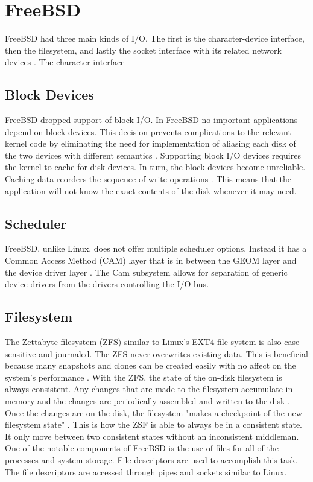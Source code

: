 \section{FreeBSD}
FreeBSD had three main kinds of I/O. The first is the character-device interface, then the filesystem, and lastly the socket interface with its related network devices \cite{LinuxTextbook}. 
 The character interface

\subsection{Block Devices}
FreeBSD dropped support of block I/O. In FreeBSD no important applications depend on block devices. This decision prevents complications to the relevant kernel code by eliminating the need for implementation of aliasing each disk of the two devices with different semantics \cite{freebsdArchitectureHandbook9}. Supporting block I/O devices requires the kernel to cache for disk devices. In turn, the block devices become unreliable. Caching data reorders the sequence of write operations \cite{freebsdArchitectureHandbook9}. This means that the application will not know the exact contents of the disk whenever it may need.


\subsection{Scheduler}
FreeBSD, unlike Linux, does not offer multiple scheduler options. Instead it has a Common Access Method (CAM) layer that is in between the GEOM layer and the device driver layer \cite{Freebsdtext}. The Cam subsystem allows for separation of generic device drivers from the drivers controlling the I/O bus.

\subsection{Filesystem}
The Zettabyte filesystem (ZFS) similar to Linux's EXT4 file system is also case sensitive and journaled. The ZFS never overwrites existing data. This is beneficial because many snapshots and clones can be created easily with no affect on the system's performance \cite{Freebsdtext}. With the ZFS, the state of the on-disk filesystem is always consistent. Any changes that are made to the filesystem accumulate in memory and the changes are periodically assembled and written to the disk \cite{Freebsdtext}. Once the changes are on the disk, the filesystem "makes a checkpoint of the new filesystem state" \cite{Freebsdtext}. This is how the ZSF is able to always be in a consistent state. It only move between two consistent states without an inconsistent middleman. One of the notable components of FreeBSD is the use of files for all of the processes and system storage. File descriptors are used to accomplish this task. The file descriptors are accessed through pipes and sockets similar to Linux\cite{Freebsdtext}.  


